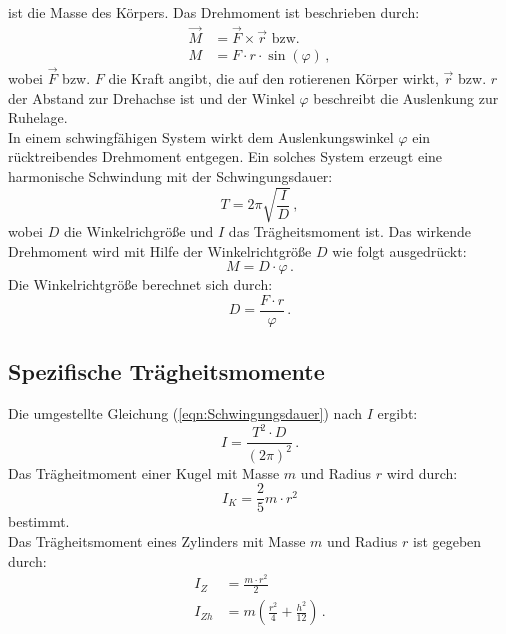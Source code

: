 ist die Masse des Körpers. 
Das Drehmoment ist beschrieben durch:
\begin{align}
    \vec{M} &= \vec{F} \times \vec {r} \text{  bzw.} \label{eqn:DrehmomentVektor} \\
    M &= F \cdot r \cdot \sin \left(\varphi \right) \,, \label{eqn:DrehmomentSkalar}
\end{align}
%
wobei $\vec{F}$ bzw. $F$ die Kraft angibt, die auf den rotierenen Körper wirkt, $\vec{r}$ 
bzw. $r$ der Abstand zur Drehachse ist und der Winkel $\varphi$ beschreibt die Auslenkung zur
Ruhelage. \\
In einem schwingfähigen System wirkt dem Auslenkungswinkel $\varphi$ ein rücktreibendes Drehmoment entgegen.
Ein solches System erzeugt eine harmonische Schwindung mit der Schwingungsdauer: 
\begin{equation}
    T = 2 \pi \sqrt{\frac{I}{D}}\,,
    \label{eqn:Schwingungsdauer}
 \end{equation}
wobei $D$ die Winkelrichgröße und $I$ das Trägheitsmoment ist. 
Das wirkende Drehmoment wird mit Hilfe der Winkelrichtgröße $D$ wie folgt ausgedrückt:
\begin{equation}
   M = D \cdot \varphi\,.
   \label{eqn:DrehmomentMitWinkelrichtgröße}
\end{equation}
%
Die Winkelrichtgröße berechnet sich durch: 
\begin{equation}
   D = \frac{F \cdot r}{\varphi}\,.
    \label{eqn:Winkelrichgröße}
\end{equation}
%
\subsection{Spezifische Trägheitsmomente}
\label{sec:Trägheitsmomente}
Die umgestellte Gleichung (\ref{eqn:Schwingungsdauer}) nach $I$ ergibt:
\begin{equation}
    I = \frac{T^{2} \cdot D}{\left(2 \pi\right)^{2}}\,.
    \label{eqn:TragheitmomentAusSchwingungsdauer}
\end{equation}
%
Das Trägheitmoment einer Kugel mit Masse $m$ und Radius $r$ wird durch: 
\begin{equation}
    I_{K} = \frac{2}{5}m \cdot r^{2}
    \label{eqn:TragheitKugel}
\end{equation}
bestimmt. \\
Das Trägheitsmoment eines Zylinders mit Masse $m$ und Radius $r$ ist gegeben 
durch:
\begin{align}
    I_{Z} &= \frac{m \cdot r^2}{2} \label{eqn:TragheitZylinder} \\
    I_{Zh} &= m \left(\frac{r^{2}}{4} + \frac{h^{2}}{12} \right) \label{eqn:TrägheitZylinderQuer}\,.
\end{align}
%
%
